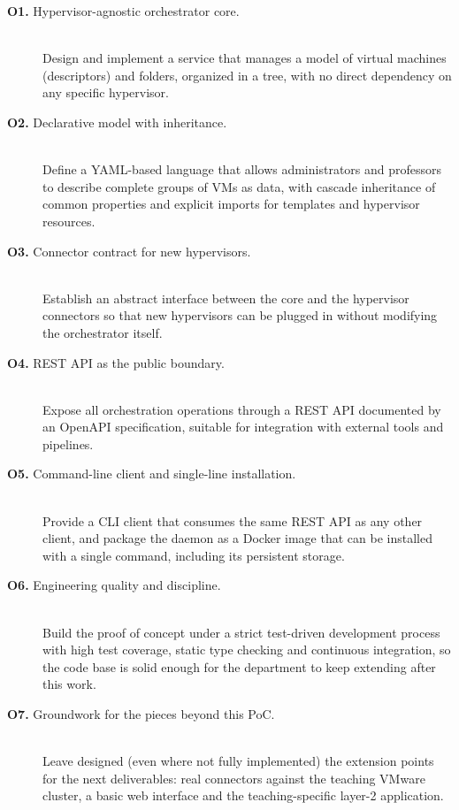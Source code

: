\begin{description}
  \item[\textbf{O1.} Hypervisor-agnostic orchestrator core.] \mbox{}\\
    Design and implement a service that manages a model of virtual
    machines (descriptors) and folders, organized in a tree, with no
    direct dependency on any specific hypervisor.
  \item[\textbf{O2.} Declarative model with inheritance.] \mbox{}\\
    Define a YAML-based language that allows administrators and
    professors to describe complete groups of VMs as data, with
    cascade inheritance of common properties and explicit imports for
    templates and hypervisor resources.
  \item[\textbf{O3.} Connector contract for new hypervisors.] \mbox{}\\
    Establish an abstract interface between the core and the
    hypervisor connectors so that new hypervisors can be plugged in
    without modifying the orchestrator itself.
  \item[\textbf{O4.} REST API as the public boundary.] \mbox{}\\
    Expose all orchestration operations through a REST API documented
    by an OpenAPI specification, suitable for integration with
    external tools and pipelines.
  \item[\textbf{O5.} Command-line client and single-line installation.] \mbox{}\\
    Provide a CLI client that consumes the same REST API as any other
    client, and package the daemon as a Docker image that can be
    installed with a single command, including its persistent storage.
  \item[\textbf{O6.} Engineering quality and discipline.] \mbox{}\\
    Build the proof of concept under a strict test-driven development
    process with high test coverage, static type checking and
    continuous integration, so the code base is solid enough for the
    department to keep extending after this work.
  \item[\textbf{O7.} Groundwork for the pieces beyond this PoC.] \mbox{}\\
    Leave designed (even where not fully implemented) the extension
    points for the next deliverables: real connectors against the
    teaching VMware cluster, a basic web interface and the
    teaching-specific layer-2 application.
\end{description}

